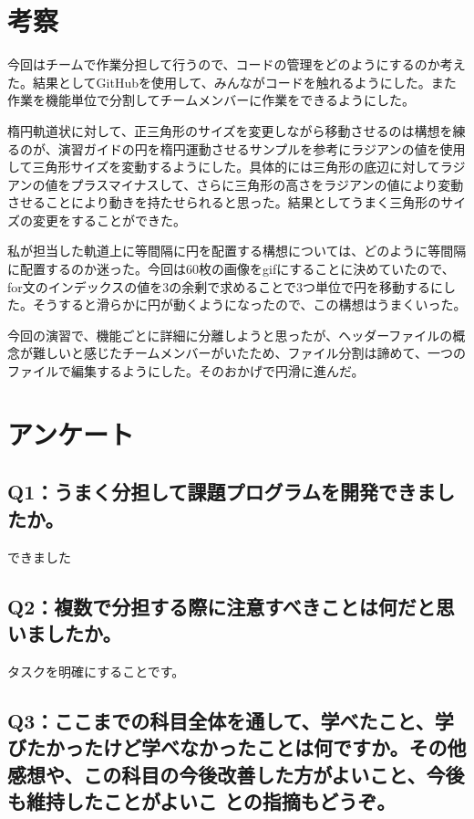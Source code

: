 \documentclass[12pt,a4j]{jarticle}
\begin{document}
\section{考察}

今回はチームで作業分担して行うので、コードの管理をどのようにするのか考えた。結果としてGitHubを使用して、みんながコードを触れるようにした。また作業を機能単位で分割してチームメンバーに作業をできるようにした。

楕円軌道状に対して、正三角形のサイズを変更しながら移動させるのは構想を練るのが、演習ガイドの円を楕円運動させるサンプルを参考にラジアンの値を使用して三角形サイズを変動するようにした。具体的には三角形の底辺に対してラジアンの値をプラスマイナスして、さらに三角形の高さをラジアンの値により変動させることにより動きを持たせられると思った。結果としてうまく三角形のサイズの変更をすることができた。

私が担当した軌道上に等間隔に円を配置する構想については、どのように等間隔に配置するのか迷った。今回は60枚の画像をgifにすることに決めていたので、for文のインデックスの値を3の余剰で求めることで3つ単位で円を移動するにした。そうすると滑らかに円が動くようになったので、この構想はうまくいった。

今回の演習で、機能ごとに詳細に分離しようと思ったが、ヘッダーファイルの概念が難しいと感じたチームメンバーがいたため、ファイル分割は諦めて、一つのファイルで編集するようにした。そのおかげで円滑に進んだ。

\section{アンケート}

\subsection{Q1：うまく分担して課題プログラムを開発できましたか。}

できました

\subsection{Q2：複数で分担する際に注意すべきことは何だと思いましたか。}

タスクを明確にすることです。

\subsection{Q3：ここまでの科目全体を通して、学べたこと、学びたかったけど学べなかったことは何ですか。その他感想や、この科目の今後改善した方がよいこと、今後も維持したことがよいこ との指摘もどうぞ。}
\end{document}
